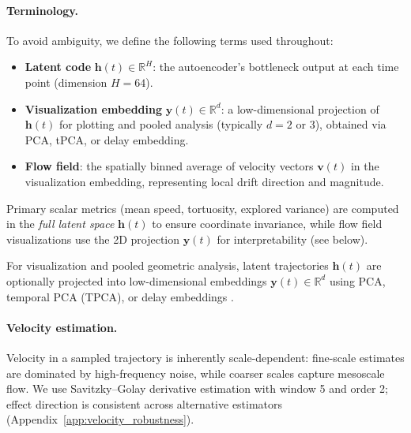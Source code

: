 \documentclass[5p,twocolumn,authoryear]{elsarticle}
\begin{document}
\paragraph{Terminology.}
To avoid ambiguity, we define the following terms used throughout:
\begin{itemize}
    \item \textbf{Latent code} $\mathbf{h}(t) \in \mathbb{R}^{H}$: the autoencoder's bottleneck output at each time point (dimension $H=64$).
    \item \textbf{Visualization embedding} $\mathbf{y}(t) \in \mathbb{R}^{d}$: a low-dimensional projection of $\mathbf{h}(t)$ for plotting and pooled analysis (typically $d=2$ or $3$), obtained via PCA, tPCA, or delay embedding.
    \item \textbf{Flow field}: the spatially binned average of velocity vectors $\mathbf{v}(t)$ in the visualization embedding, representing local drift direction and magnitude.
\end{itemize}
Primary scalar metrics (mean speed, tortuosity, explored variance) are computed in the \emph{full latent space} $\mathbf{h}(t)$ to ensure coordinate invariance, while flow field visualizations use the 2D projection $\mathbf{y}(t)$ for interpretability (see below).

For visualization and pooled geometric analysis, latent trajectories $\mathbf{h}(t)$ are optionally projected into low-dimensional embeddings $\mathbf{y}(t) \in \mathbb{R}^d$ using PCA, temporal PCA (TPCA), or delay embeddings \citep{Takens1981,Sauer1991}.

\paragraph{Velocity estimation.}
Velocity in a sampled trajectory is inherently scale-dependent: fine-scale estimates are dominated by high-frequency noise, while coarser scales capture mesoscale flow. We use Savitzky--Golay derivative estimation \citep{SavitzkyGolay1964} with window 5 and order 2; effect direction is consistent across alternative estimators (Appendix~\ref{app:velocity_robustness}).
\end{document}
